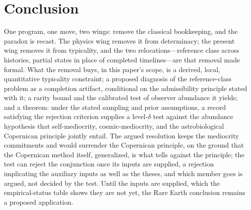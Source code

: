 \section{Conclusion}
\label{sec:conclusion}

One program, one move, two wings: remove the classical bookkeeping, and the paradox is recast. The physics wing removes it from determinacy; the present wing removes it from typicality, and the two relocations---reference class across histories, partial states in place of completed timelines---are that removal made formal. What the removal buys, in this paper's scope, is a derived, local, quantitative typicality constraint; a proposed diagnosis of the reference-class problem as a completion artifact, conditional on the admissibility principle stated with it; a rarity bound and the calibrated test of observer abundance it yields; and a theorem: under the stated sampling and prior assumptions, a record satisfying the rejection criterion supplies a level-$\delta$ test against the abundance hypothesis that self-mediocrity, cosmic-mediocrity, and the astrobiological Copernican principle jointly entail. The argued resolution keeps the mediocrity commitments and would surrender the Copernican principle, on the ground that the Copernican method itself, generalized, is what tells against the principle; the test can reject the conjunction once its inputs are supplied, a rejection implicating the auxiliary inputs as well as the theses, and which member goes is argued, not decided by the test. Until the inputs are supplied, which the empirical-status table shows they are not yet, the Rare Earth conclusion remains a proposed application.

